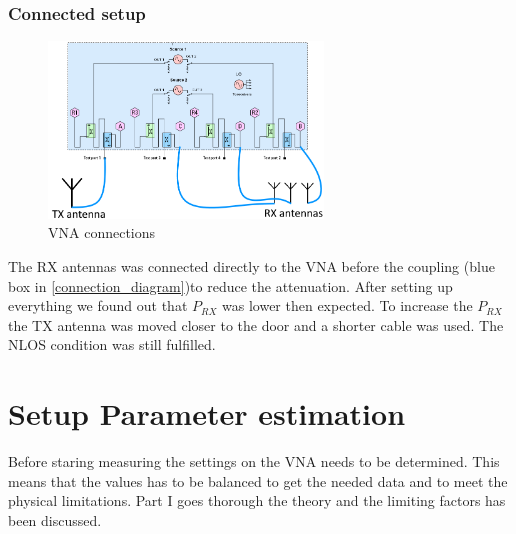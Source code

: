 \subsection{Connected setup}
\label{connected_setup}

\begin{figure}[H]
\centering
\includegraphics[width=0.65\textwidth]{figures/Gimp_figures/4portVNA.png}
\caption{VNA connections}
\label{connection_diagram}
\end{figure}

The RX antennas was connected directly to the VNA before the coupling (blue box in \autoref{connection_diagram})to reduce the attenuation. After setting up everything we found out that $P_{RX}$ was lower then expected. To increase the $P_{RX}$ the TX antenna was moved closer to the door and a shorter cable was used. The NLOS condition was still fulfilled. 

%
%


\chapter{Setup Parameter estimation}\label{sec:setup_parameter}
Before staring measuring the settings on the VNA needs to be determined. This means that the values has to be  balanced to get the needed data and to meet the physical limitations. Part I goes thorough the theory and the limiting factors has been discussed.

